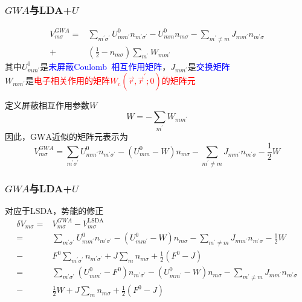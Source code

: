 \frame
{
	\frametitle{$GWA$与\textrm{LDA+}$U$}
	\begin{displaymath}
		\begin{aligned}
			V_{m\sigma}^{GWA}=&\sum_{m^{\prime}\sigma^{\prime}}U_{mm^{\prime}}^0n_{m^{\prime}\sigma^{\prime}}-U_{mm}^0n_{m\sigma}-\sum_{m^{\prime}\neq m}J_{mm^{\prime}}n_{m^{\prime}\sigma}\\
			+&\left( \frac12-n_{m\sigma} \right)\sum_{m^{\prime}}W_{mm^{\prime}}
		\end{aligned}
	\end{displaymath}
	其中$U_{mm^{\prime}}^0$是\textcolor{blue}{未屏蔽\textrm{Coulomb~}相互作用矩阵}，$J_{mm^{\prime}}$是\textcolor{blue}{交换矩阵}\\
	$W_{mm^{\prime}}$是\textcolor{red}{电子相关作用的矩阵$W_{\mathrm c}(\vec r,\vec r^{\prime};0)$的矩阵元}

	定义屏蔽相互作用参数$W$
	\begin{displaymath}
		W=-\sum_{m^{\prime}}W_{mm^{\prime}}
	\end{displaymath}
	因此，$\mathrm{GWA}$近似的矩阵元表示为
	\begin{displaymath}
			V_{m\sigma}^{GWA}=\sum_{m^{\prime}\sigma^{\prime}}U_{mm^{\prime}}^0n_{m^{\prime}\sigma^{\prime}}-(U_{mm}^0-W)n_{m\sigma}-\sum_{m^{\prime}\neq m}J_{mm^{\prime}}n_{m^{\prime}\sigma}-\frac12W
	\end{displaymath}
}

\frame
{
	\frametitle{$GWA$与\textrm{LDA+}$U$}
	对应于\textrm{LSDA}，势能的修正
	\begin{displaymath}
		\begin{aligned}
			\delta V_{m\sigma}=&V_{m\sigma}^{GWA}-V_{m\sigma}^{\mathrm{LSDA}}\\
			=&\sum_{m^{\prime}\sigma^{\prime}}U_{mm^{\prime}}^0n_{m^{\prime}\sigma^{\prime}}-(U_{mm^{\prime}}^0-W)n_{m\sigma}-\sum_{m^{\prime}\neq m}J_{mm^{\prime}}n_{m^{\prime}\sigma}-\frac12W\\
			-&F^0\sum_{m^{\prime}\sigma^{\prime}}n_{m^{\prime}\sigma^{\prime}}+J\sum_mn_{m\sigma}+\frac12(F^0-J)\\
			=&\sum_{m^{\prime}\sigma^{\prime}}(U_{mm^{\prime}}^0-F^0)n_{m^{\prime}\sigma^{\prime}}-(U_{mm^{\prime}}^0-W)n_{m\sigma}-\sum_{m^{\prime}\neq m}J_{mm^{\prime}}n_{m^{\prime}\sigma}\\
			-&\frac12W+J\sum_mn_{m\sigma}+\frac12(F^0-J)
		\end{aligned}
	\end{displaymath}
}

